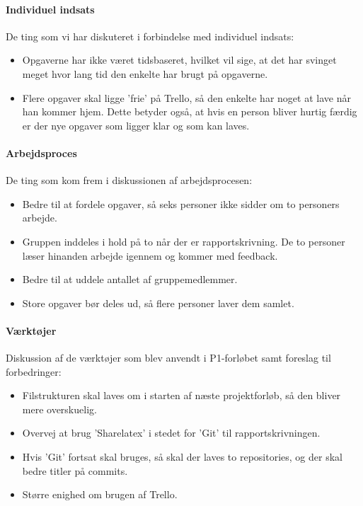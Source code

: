 \documentclass[oneside,a4paper,titlepage]{article}
\begin{document}
\paragraph{Individuel indsats}

De ting som vi har diskuteret i forbindelse med individuel indsats:

\begin{itemize}
\item Opgaverne har ikke været tidsbaseret, hvilket vil sige, at det har svinget meget hvor lang tid den enkelte har brugt på opgaverne.
\item Flere opgaver skal ligge 'frie' på Trello, så den enkelte har noget at lave når han kommer hjem. Dette betyder også, at hvis en person bliver hurtig færdig er der nye opgaver som ligger klar og som kan laves.
\end{itemize}

\paragraph{Arbejdsproces}

De ting som kom frem i diskussionen af arbejdsprocesen:

\begin{itemize}
\item Bedre til at fordele opgaver, så seks personer ikke sidder om to personers arbejde. 
\item Gruppen inddeles i hold på to når der er rapportskrivning. De to personer læser hinanden arbejde igennem og kommer med feedback.
\item Bedre til at uddele antallet af gruppemedlemmer. 
\item Store opgaver bør deles ud, så flere personer laver dem samlet.
\end{itemize}

\paragraph{Værktøjer}

Diskussion af de værktøjer som blev anvendt i P1-forløbet samt foreslag til forbedringer:

\begin{itemize}
\item Filstrukturen skal laves om i starten af næste projektforløb, så den bliver mere overskuelig.
\item Overvej at brug 'Sharelatex' i stedet for 'Git' til rapportskrivningen. 
\item Hvis 'Git' fortsat skal bruges, så skal der laves to repositories, og der skal bedre titler på commits. 
\item Større enighed om brugen af Trello.
\end{itemize}
\clearpage
\end{document}

